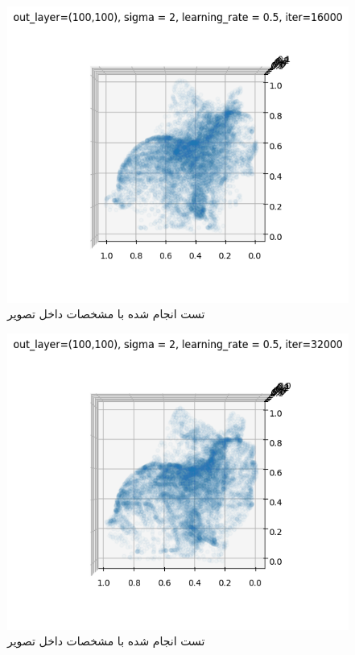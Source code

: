 \documentclass{article}
\begin{document}
\begin{figure}[!h]
    \centering\includegraphics[scale=.65]{./p1-14}
    \caption{تست انجام شده با مشخصات داخل تصویر}\label{fig.114}
\end{figure}

\begin{figure}[!h]
    \centering\includegraphics[scale=.65]{./p1-15}
    \caption{تست انجام شده با مشخصات داخل تصویر}\label{fig.115}
\end{figure}
\end{document}
